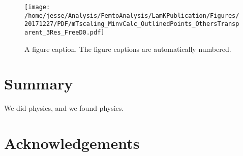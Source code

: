 \documentclass[ALICE,manyauthors]{cernphprep}
\begin{document}
\begin{figure}[b]
\texttt{[image: /home/jesse/Analysis/FemtoAnalysis/LamKPublication/Figures/20171227/PDF/mTscaling\_MinvCalc\_OutlinedPoints\_OthersTransparent\_3Res\_FreeD0.pdf]}%
\caption{\label{fig:mTScalingOfRadii_NoRes} A figure caption. The figure captions are
automatically numbered.}
\end{figure}



\section{Summary}
\label{sec:Summary}
We did physics, and we found physics.

\newenvironment{acknowledgement}{\relax}{\relax}
\begin{acknowledgement}
\section*{Acknowledgements}
\end{acknowledgement}



\newpage
\appendix
%
%
\end{document}
